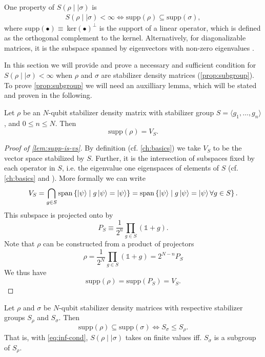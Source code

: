 One property of $S(\rho\mid\mid\sigma)$ is
\cite{leditzkyRelativeEntropiesTheir2016}
\begin{align}\label{eq:inf-cond}
  S(\rho\mid\mid\sigma) < \infty \Longleftrightarrow \mathrm{supp}(\rho) \subseteq
  \mathrm{supp}(\sigma)
,\end{align}
where supp$(\bullet)\equiv\ $ker$(\bullet)^\perp$ is the support of a linear
operator, which is defined as the orthogonal complement to the kernel.
Alternatively, for diagonalizable matrices, it is the subspace spanned by
eigenvectors with non-zero eigenvalues
\cite{schumacherRelativeEntropyQuantum2000}.

In this section we will provide and prove a necessary and sufficient condition
for $S(\rho\mid\mid\sigma)<\infty$ when $\rho$ and $\sigma$ are stabilizer
density matrices (\cref{prop:subgroup}). 
To prove \cref{prop:subgroup} we will need an auxilliary lemma, which will
be stated and proven in the following.
\begin{lem}\label{lem:supp-is-vs}
  Let $\rho$ be an $N$-qubit stabilizer density matrix with stabilizer group $S = \langle
  g_1, \ldots, g_n \rangle$, and $0\leq n \leq N$.
  Then \[ \mathrm{supp}(\rho) = V_{S}.\]
\end{lem}
\begin{proof}[Proof of \cref{lem:supp-is-vs}]
  By definition (cf. \cref{ch:basics}) we take $V_{S}$ to be the vector space
  stabilized by $S$.  Further, it is the intersection of subspaces fixed by
  each operator in $S$, i.e. the eigenvalue one eigenspaces of elements of $S$
  (cf.  \cref{ch:basics} and \cite{nielsenQuantumComputationQuantum2010}). More
  formally we can write
  \[ 
    V_S = \bigcap_{g \in S}  \mathrm{span}\left\{\ket{\psi} \mid g\ket{\psi} =
    \ket{\psi}\right\} = \mathrm{span}\left\{\ket{\psi} \mid g\ket{\psi} =
    \ket{\psi} \forall g \in S\right\}.
  \]
  This subspace is projected onto by
  \[ P_S \equiv \frac{1}{2^n} \prod_{g\in S} \left(\mathds{1} + g\right).\]
  Note that $\rho$ can be constructed from a product of projectors
  \cite{gottesmanStabilizerCodesQuantum1997}
  \[ \rho = \frac{1}{2^N} \prod_{g \in S} \left(\mathds{1} + g\right) = 2^{N-n} P_S \]
  We thus have
  \[ \mathrm{supp}(\rho) = \mathrm{supp}(P_S) = V_S. \]
\end{proof}

\begin{prop}\label{prop:subgroup}
  Let $\rho$ and $\sigma$ be $N$-qubit stabilizer density matrices with
  respective stabilizer groups $S_\rho$ and $S_\sigma$. Then
  \[ \mathrm{supp}(\rho)\subseteq \mathrm{supp}(\sigma) \Longleftrightarrow
  S_\sigma \leq S_\rho. \]
  That is, with \cref{eq:inf-cond}, $S(\rho\mid\mid\sigma)$ takes on finite values iff. $S_\sigma$ is a
  subgroup of $S_\rho$.
\end{prop}

